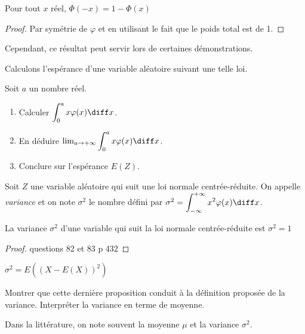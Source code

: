 \documentclass[12pt,a4paper,french]{article}
\begin{document}
\begin{proposition}
  Pour tout $x$ réel, $\Phi(-x) = 1 - \Phi(x)$
\end{proposition}
\begin{proof}
  Par symétrie de $\varphi$ et en utilisant le fait que le poids total
  est de 1.
\end{proof}

Cependant, ce résultat peut servir lors de certaines démonstrations.

Calculons l'espérance d'une variable aléatoire suivant une telle loi.

\begin{question}
  Soit $a$ un nombre réel.
  \begin{enumerate}
    \item Calculer $\displaystyle\int_0^a x\varphi(x) \diff x$.
    \item En déduire $\lim_{a\to+\infty} \displaystyle\int_0^a x\varphi(x)
      \diff x$.
    \item Conclure sur l'espérance $E(Z)$.
  \end{enumerate}
\end{question}

\begin{definition}[Variance]
  Soit $Z$ une variable aléatoire qui suit une loi normale
  centrée-réduite. On appelle \emph{variance} et on note $\sigma^2$ le
  nombre défini par $\sigma^2 = \displaystyle\int_{-\infty}^{+\infty}
  x^2\varphi(x) \diff x$.
\end{definition}

\begin{proposition}
  La variance $\sigma^2$ d'une variable qui suit la loi normale
  centrée-réduite est $\sigma^2 = 1$
\end{proposition}
\begin{proof}
  questions 82 et 83 p 432
\end{proof}

\begin{proposition}[admise]
  $\sigma^2 = E((X - E(X))^2)$
\end{proposition}

\begin{question}
  Montrer que cette dernière proposition conduit à la définition
  proposée de la variance. Interpréter la variance en terme de
  moyenne.
\end{question}

Dans la littérature, on note souvent la moyenne $\mu$ et la variance
$\sigma^2$.
\end{document}
